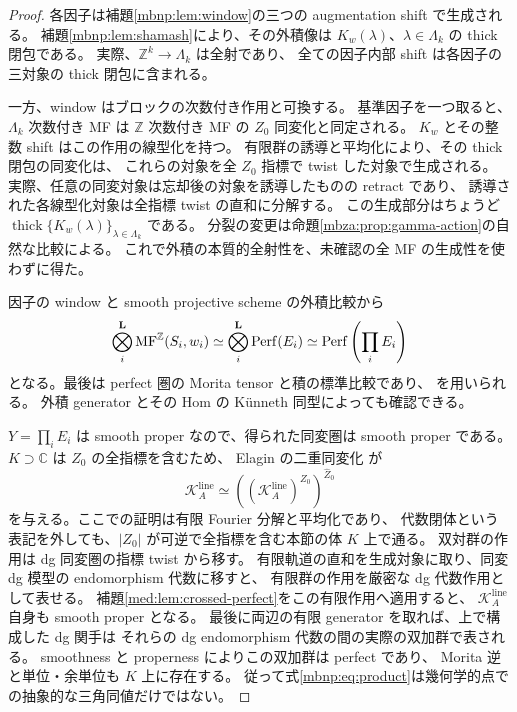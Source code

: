 \begin{proof}
各因子は補題\ref{mbnp:lem:window}の三つの augmentation shift で生成される。
補題\ref{mbnp:lem:shamash}により、その外積像は
$K_w(\lambda)$、$\lambda\in\Lambda_k$ の thick 閉包である。
実際、$\mathbb Z^k\to\Lambda_k$ は全射であり、
全ての因子内部 shift は各因子の三対象の thick 閉包に含まれる。

一方、window はブロックの次数付き作用と可換する。
基準因子を一つ取ると、$\Lambda_k$ 次数付き MF は
$\mathbb Z$ 次数付き MF の $Z_0$ 同変化と同定される。
$K_w$ とその整数 shift はこの作用の線型化を持つ。
有限群の誘導と平均化により、その thick 閉包の同変化は、
これらの対象を全 $Z_0$ 指標で twist した対象で生成される。
実際、任意の同変対象は忘却後の対象を誘導したものの retract であり、
誘導された各線型化対象は全指標 twist の直和に分解する。
この生成部分はちょうど $\operatorname{thick}\{K_w(\lambda)\}_{\lambda\in\Lambda_k}$ である。
分裂の変更は命題\ref{mbza:prop:gamma-action}の自然な比較による。
これで外積の本質的全射性を、未確認の全 MF の生成性を使わずに得た。

因子の window と smooth projective scheme の外積比較から
\[
 \bigotimes_i^{\mathbf L}\operatorname{MF}^{\mathbb Z}(S_i,w_i)
  \simeq\bigotimes_i^{\mathbf L}\operatorname{Perf}(E_i)
  \simeq\operatorname{Perf}\left(\prod_iE_i\right)
\]
となる。最後は perfect 圏の Morita tensor と積の標準比較であり、
\cite[Section~8.3]{MBRPToenMorita}を用いられる。
外積 generator とその Hom の K\"unneth 同型によっても確認できる。

$Y=\prod_iE_i$ は smooth proper なので、得られた同変圏は smooth proper である。
$K\supset\mathbb C$ は $Z_0$ の全指標を含むため、
Elagin の二重同変化 \cite[Theorem~4.2, Section~8]{MEDElagin}が
\[
 \mathcal K_A^{\mathrm{line}}
   \simeq\left((\mathcal K_A^{\mathrm{line}})^{Z_0}\right)^{\widehat Z_0}
\]
を与える。ここでの証明は有限 Fourier 分解と平均化であり、
代数閉体という表記を外しても、$|Z_0|$ が可逆で全指標を含む本節の体 $K$ 上で通る。
双対群の作用は dg 同変圏の指標 twist から移す。
有限軌道の直和を生成対象に取り、同変 dg 模型の endomorphism 代数に移すと、
有限群の作用を厳密な dg 代数作用として表せる。
補題\ref{med:lem:crossed-perfect}をこの有限作用へ適用すると、
$\mathcal K_A^{\mathrm{line}}$ 自身も smooth proper となる。
最後に両辺の有限 generator を取れば、上で構成した dg 関手は
それらの dg endomorphism 代数の間の実際の双加群で表される。
smoothness と properness によりこの双加群は perfect であり、
Morita 逆と単位・余単位も $K$ 上に存在する。
従って式\eqref{mbnp:eq:product}は幾何学的点での抽象的な三角同値だけではない。
\end{proof}

